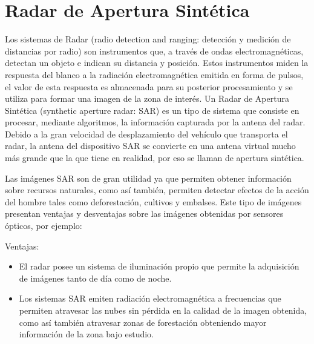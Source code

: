 
\chapter{Radar de Apertura Sintética}

Los sistemas de Radar (radio detection and ranging: detección y medición de distancias por radio) son instrumentos que, a través de ondas electromagnéticas, detectan un objeto e indican su distancia y posición. 
Estos instrumentos miden la respuesta del blanco
a la radiación electromagnética emitida en forma de pulsos, el valor de esta respuesta es almacenada para su posterior procesamiento y se utiliza para formar una imagen de la zona de interés. 
Un Radar de Apertura Sintética (synthetic aperture radar: SAR) es un tipo de sistema que consiste en procesar, mediante algoritmos, la información capturada por la antena del radar. Debido a la gran velocidad de desplazamiento del vehículo que transporta el radar, la antena del dispositivo SAR  se convierte en una antena virtual mucho más grande que la que tiene en realidad, por eso se llaman de apertura sintética. 


Las imágenes SAR son de gran utilidad ya que permiten obtener información sobre recursos naturales, como así también, permiten detectar efectos de la acción del hombre tales como deforestación, cultivos y embalses. Este tipo de imágenes presentan ventajas y desventajas sobre las imágenes obtenidas por sensores ópticos, por ejemplo: 

\medskip

Ventajas:
\begin{itemize}
	\item El radar posee un sistema de iluminación propio que permite la adquisición de imágenes tanto de día como de noche.
	\item Los sistemas SAR emiten radiación electromagnética a frecuencias que permiten atravesar las nubes sin pérdida en la calidad de la imagen obtenida, como así también atravesar zonas de forestación obteniendo mayor información de la zona bajo estudio.
\end{itemize}

